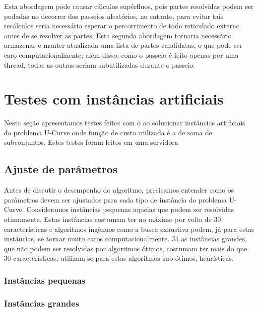 Esta abordagem pode causar cálculos supérfluos, pois partes resolvidas
podem ser podadas no decorrer dos passeios aleatórios, no entanto, para 
evitar tais recálculos seria necessário esperar o percorrimento de todo
reticulado externo antes de se resolver as partes. Esta segunda 
abordagem tornaria necessário armazenar e manter atualizada uma lista de 
partes candidatas, o que pode ser caro computacionalmente; além disso, 
como o passeio é feito apenas por uma thread, todas as outras seriam
subutilizadas durante o passeio. 

\section{Testes com instâncias artificiais}
Nesta seção apresentamos testes feitos com o  ao  
solucionar instâncias artificiais do problema U-Curve onde função de 
custo utilizada é a de soma de subconjuntos. Estes testes foram feitos
em uma servidora %

\subsection{Ajuste de parâmetros}
Antes de discutir o desempenho do algoritmo, precisamos entender como
os parâmetros devem ser ajustados para cada tipo de instância do 
problema U-Curve. Consideramos instâncias pequenas aquelas que podem ser
resolvidas otimamente. Estas instâncias costumam ter no máximo por volta
de 30 características e algoritmos ingênuos como a busca exaustiva 
podem, já para estas instâncias, se tornar muito caros 
computacionalmente. Já as instâncias grandes, que não podem ser 
resolvidas por algoritmos ótimos, costumam ter mais do que 30 
características; utilizam-se para estas algoritmos sub-ótimos, 
heurísticas.

\subsubsection{Instâncias pequenas}

\subsubsection{Instâncias grandes}
